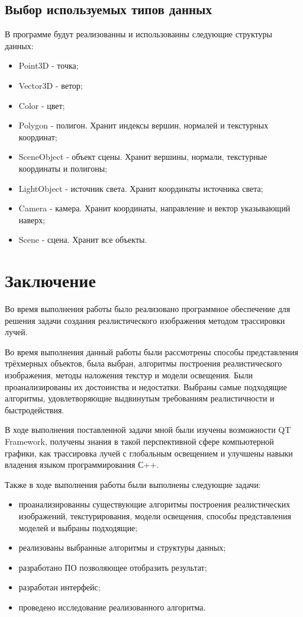 \documentclass[12pt,a4paper,oneside]{report}
\begin{document}
		\section{Выбор используемых типов данных}
			\quad В программе будут реализованны и использованны следующие структуры данных:
			\begin{itemize}
    				\item Point3D - точка;
    				\item Vector3D - ветор;
    				\item Color - цвет;
    				\item Polygon - полигон. Хранит индексы вершин, нормалей и  текстурных координат;
    				\item SceneObject - объект сцены. Хранит вершины, нормали, текстурные координаты и полигоны;
    				\item LightObject - источник света. Хранит координаты источника света;
    				\item Camera - камера. Хранит координаты, направление и вектор указывающий наверх;
    				\item Scene - сцена. Хранит все объекты.
    			\end{itemize}
    \chapter{Заключение}
    
    	\quad Во время выполнения работы было реализовано программное обеспечение для решения задачи создания реалистического изображения методом трассировки лучей.

    	 Во время выполнения данный работы были рассмотрены способы представления трёхмерных объектов, была выбран, алгоритмы построения реалистического изображения, методы наложения текстур и модели освещения. Были проанализированы их достоинства и недостатки. Выбраны самые подходящие алгоритмы, удовлетворяющие выдвинутым требованиям реалистичности и быстродействия.
    
    	В ходе выполнения поставленной задачи мной были изучены возможности QT Framework, получены знания в такой перспективной сфере компьютерной графики, как трассировка лучей с глобальным освещением и улучшены навыки владения языком программирования С++.
    
    	Также в ходе выполнения работы были выполнены следующие задачи:
    	\begin{itemize}
    			\item проанализированны существующие алгоритмы построения реалистических изображений, текстурирования, модели освещения, способы представления моделей и выбраны подходящие;
    			\item реализованы выбранные алгоритмы и структуры данных;
    			\item разработано ПО позволяющее отобразить результат;
    			\item разработан интерфейс;
    			\item проведено исследование реализованного алгоритма.
    	\end{itemize}
    	
\end{document}
